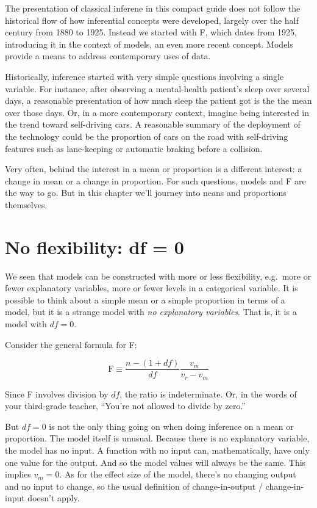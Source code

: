 \documentclass[]{book}
\begin{document}
The presentation of classical inferene in this compact guide does not follow the historical flow of how inferential concepts were developed, largely over the half century from 1880 to 1925. Instead we started with F, which dates from 1925, introducing it in the context of models, an even more recent concept. Models provide a means to address contemporary uses of data.

Historically, inference started with very simple questions involving a single variable. For instance, after observing a mental-health patient's sleep over several days, a reasonable presentation of how much sleep the patient got is the the mean over those days. Or, in a more contemporary context, imagine being interested in the trend toward self-driving cars. A reasonable summary of the deployment of the technology could be the proportion of cars on the road with self-driving features such as lane-keeping or automatic braking before a collision.

Very often, behind the interest in a mean or proportion is a different interest: a change in mean or a change in proportion. For such questions, models and F are the way to go. But in this chapter we'll journey into neans and proportions themselves.

\hypertarget{no-flexibility-df-0}{%
\section{No flexibility: df = 0}\label{no-flexibility-df-0}}

We seen that models can be constructed with more or less flexibility, e.g.~more or fewer explanatory variables, more or fewer levels in a categorical variable. It is possible to think about a simple mean or a simple proportion in terms of a model, but it is a strange model with \emph{no explanatory variables}. That is, it is a model with \(df = 0\).

Consider the general formula for F:

\[ \mbox{F} \equiv \frac{n - (1+df)}{df} \frac{v_m}{v_r - v_m}\]

Since F involves division by \(df\), the ratio is indeterminate. Or, in the words of your third-grade teacher, ``You're not allowed to divide by zero.''

But \(df=0\) is not the only thing going on when doing inference on a mean or proportion. The model itself is unusual. Because there is no explanatory variable, the model has no input. A function with no input can, mathematically, have only one value for the output. And so the model values will always be the same. This implies \(v_m = 0\). As for the effect size of the model, there's no changing output and no input to change, so the usual definition of change-in-output / change-in-input doesn't apply.
\end{document}
